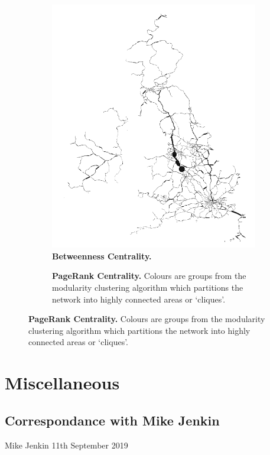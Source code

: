\begin{figure}[H]
\begin{subfigure}[t]{.49\textwidth}
     \centering
         \includegraphics[width=\textwidth]{rail/betweenness.png}
        \caption{ \textbf{Betweenness Centrality.}}
\end{subfigure}
\begin{subfigure}[t]{.49\textwidth}
     \centering
        \caption{ \textbf{PageRank Centrality.} Colours are groups from the modularity clustering algorithm which partitions the network into highly connected areas or `cliques'. }
\end{subfigure}
\end{figure}




\chapter{Miscellaneous}




\section{Correspondance with Mike Jenkin}\label{appendix:correspondance}
Mike Jenkin 11th September 2019

